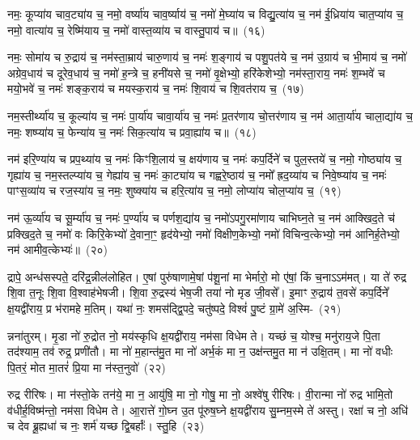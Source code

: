 नमः॒ कूप्या॑य चाव॒ट्या॑य च॒ नमो॒ वर्ष्या॑य चाव॒र्ष्याय॑ च॒ नमो॑ मे॒घ्या॑य च विद्यु॒त्या॑य च॒ नम॑ ई॒ध्रिया॑य चात॒प्या॑य च॒ नमो॒ वात्या॑य च॒ रेष्मि॑याय च॒ नमो॑ वास्त॒व्या॑य च वास्तु॒पाय॑ च॥~(१६)\ip

{\anuvakamend[{वै॒श॒न्ताय॑ च त्रि॒ꣳ॒शच्च॑}]}

नमः॒ सोमा॑य च रु॒द्राय॑ च॒ नम॑स्ता॒म्राय॑ चारु॒णाय॑ च॒ नमः॑ श॒ङ्गाय॑ च पशु॒पत॑ये च॒ नम॑ उ॒ग्राय॑ च भी॒माय॑ च॒ नमो॑ अग्रेव॒धाय॑ च दूरेव॒धाय॑ च॒ नमो॑ ह॒न्त्रे च॒ हनी॑यसे च॒ नमो॑ वृ॒क्षेभ्यो॒ हरि॑केशेभ्यो॒ नम॑स्ता॒राय॒ नमः॑ श॒म्भवे॑ च मयो॒भवे॑ च॒ नमः॑ शङ्क॒राय॑ च मयस्क॒राय॑ च॒ नमः॑ शि॒वाय॑ च शि॒वत॑राय च॒~(१७)\ip

नम॒स्तीर्थ्या॑य च॒ कूल्या॑य च॒ नमः॑ पा॒र्या॑य चावा॒र्या॑य च॒ नमः॑ प्र॒तर॑णाय चो॒त्तर॑णाय च॒ नम॑ आता॒र्या॑य चाला॒द्या॑य च॒ नमः॒ शष्प्या॑य च॒ फेन्या॑य च॒ नमः॑ सिक॒त्या॑य च प्रवा॒ह्या॑य च॥~(१८)\ip

{\anuvakamend[{शि॒वत॑राय च त्रि॒ꣳ॒शच्च॑}]}

नम॑ इरि॒ण्या॑य च प्रप॒थ्या॑य च॒ नमः॑ किꣳशि॒लाय॑ च॒ क्षय॑णाय च॒ नमः॑ कप॒र्दिने॑ च पुल॒स्तये॑ च॒ नमो॒ गोष्ठ्या॑य च॒ गृह्या॑य च॒ नम॒स्तल्प्या॑य च॒ गेह्या॑य च॒ नमः॑ का॒ट्या॑य च गह्वरे॒ष्ठाय॑ च॒ नमो᳚ ह्रद॒य्या॑य च निवे॒ष्प्या॑य च॒ नमः॑ पाꣳस॒व्या॑य च रज॒स्या॑य च॒ नमः॒ शुष्क्या॑य च हरि॒त्या॑य च॒ नमो॒ लोप्या॑य चोल॒प्या॑य च॒~(१९)\ip

नम॑ ऊ॒र्व्या॑य च सू॒र्म्या॑य च॒ नमः॑ प॒र्ण्या॑य च पर्णश॒द्या॑य च॒ नमो॑\-ऽपगु॒रमा॑णाय चाभिघ्न॒ते च॒ नम॑ आक्खिद॒ते च॑ प्रक्खिद॒ते च॒ नमो॑ वः किरि॒केभ्यो॑ दे॒वाना॒ꣳ॒ हृद॑येभ्यो॒ नमो॑ विक्षीण॒केभ्यो॒ नमो॑ विचिन्व॒त्केभ्यो॒ नम॑ आनिर्\mbox{}ह॒तेभ्यो॒ नम॑ आमीव॒त्केभ्यः॑॥~(२०)\ip

{\anuvakamend[{उ॒ल॒प्या॑य च॒ त्रय॑स्त्रिꣳशच्च}]}

द्रापे॒ अन्ध॑सस्पते॒ दरि॑द्र॒न्नील॑लोहित। ए॒षां पुरु॑षाणामे॒षां प॑शू॒नां मा भेर्मारो॒ मो ए॑षां॒ किं च॒नाऽऽम॑मत्। या ते॑ रुद्र शि॒वा त॒नूः शि॒वा वि॒श्वाह॑भेषजी। शि॒वा रु॒द्रस्य॑ भेष॒जी तया॑ नो मृड जी॒वसे᳚। इ॒माꣳ रु॒द्राय॑ त॒वसे॑ कप॒र्दिने᳚ क्ष॒यद्वी॑राय॒ प्र भ॑रामहे म॒तिम्। यथा॑ नः॒ शमस॑द्द्वि॒पदे॒ चतु॑ष्पदे॒ विश्वं॑ पु॒ष्टं ग्रा॒मे॑ अ॒स्मि-~(२१)\ip

न्नना॑तुरम्। मृ॒डा नो॑ रु॒द्रोत नो॒ मय॑स्कृधि क्ष॒यद्वी॑राय॒ नम॑सा विधेम ते। यच्छं च॒ योश्च॒ मनु॑राय॒जे पि॒ता तद॑श्याम॒ तव॑ रुद्र॒ प्रणी॑तौ। मा नो॑ म॒हान्त॑मु॒त मा नो॑ अर्भ॒कं मा न॒ उक्ष॑न्तमु॒त मा न॑ उक्षि॒तम्। मा नो॑ वधीः पि॒तरं॒ मोत मा॒तरं॑ प्रि॒या मा न॑स्त॒नुवो॑~(२२)\ip

रुद्र रीरिषः। मा न॑स्तो॒के तन॑ये॒ मा न॒ आयु॑षि॒ मा नो॒ गोषु॒ मा नो॒ अश्वे॑षु रीरिषः। वी॒रान्मा नो॑ रुद्र भामि॒तो व॑धीर्\mbox{}ह॒विष्म॑न्तो॒ नम॑सा विधेम ते। आ॒रात्ते॑ गो॒घ्न उ॒त पू॑रुष॒घ्ने क्ष॒यद्वी॑राय सु॒म्नम॒स्मे ते॑ अस्तु। रक्षा॑ च नो॒ अधि॑ च देव ब्रू॒ह्यधा॑ च नः॒ शर्म॑ यच्छ द्वि॒बर्\mbox{}हाः᳚। स्तु॒हि~(२३)\ip

